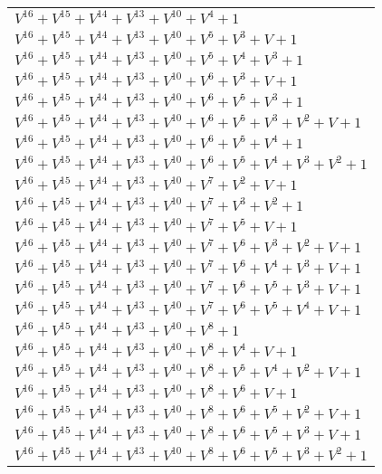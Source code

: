 \documentclass[12pt]{article}
\begin{document}
\begin{adjustwidth}{-4cm}{}
\begin{center}
\begin{longtable}{|l|}
$V^{16}  +V^{15}  +V^{14}  +V^{13}  +V^{10}  +V^{4}  + 1$ \\
$V^{16}  +V^{15}  +V^{14}  +V^{13}  +V^{10}  +V^{5}  +V^{3}  + V + 1$ \\
$V^{16}  +V^{15}  +V^{14}  +V^{13}  +V^{10}  +V^{5}  +V^{4}  +V^{3}  + 1$ \\
$V^{16}  +V^{15}  +V^{14}  +V^{13}  +V^{10}  +V^{6}  +V^{3}  + V + 1$ \\
$V^{16}  +V^{15}  +V^{14}  +V^{13}  +V^{10}  +V^{6}  +V^{5}  +V^{3}  + 1$ \\
$V^{16}  +V^{15}  +V^{14}  +V^{13}  +V^{10}  +V^{6}  +V^{5}  +V^{3}  +V^{2}  + V + 1$ \\
$V^{16}  +V^{15}  +V^{14}  +V^{13}  +V^{10}  +V^{6}  +V^{5}  +V^{4}  + 1$ \\
$V^{16}  +V^{15}  +V^{14}  +V^{13}  +V^{10}  +V^{6}  +V^{5}  +V^{4}  +V^{3}  +V^{2}  + 1$ \\
$V^{16}  +V^{15}  +V^{14}  +V^{13}  +V^{10}  +V^{7}  +V^{2}  + V + 1$ \\
$V^{16}  +V^{15}  +V^{14}  +V^{13}  +V^{10}  +V^{7}  +V^{3}  +V^{2}  + 1$ \\
$V^{16}  +V^{15}  +V^{14}  +V^{13}  +V^{10}  +V^{7}  +V^{5}  + V + 1$ \\
$V^{16}  +V^{15}  +V^{14}  +V^{13}  +V^{10}  +V^{7}  +V^{6}  +V^{3}  +V^{2}  + V + 1$ \\
$V^{16}  +V^{15}  +V^{14}  +V^{13}  +V^{10}  +V^{7}  +V^{6}  +V^{4}  +V^{3}  + V + 1$ \\
$V^{16}  +V^{15}  +V^{14}  +V^{13}  +V^{10}  +V^{7}  +V^{6}  +V^{5}  +V^{3}  + V + 1$ \\
$V^{16}  +V^{15}  +V^{14}  +V^{13}  +V^{10}  +V^{7}  +V^{6}  +V^{5}  +V^{4}  + V + 1$ \\
$V^{16}  +V^{15}  +V^{14}  +V^{13}  +V^{10}  +V^{8}  + 1$ \\
$V^{16}  +V^{15}  +V^{14}  +V^{13}  +V^{10}  +V^{8}  +V^{4}  + V + 1$ \\
$V^{16}  +V^{15}  +V^{14}  +V^{13}  +V^{10}  +V^{8}  +V^{5}  +V^{4}  +V^{2}  + V + 1$ \\
$V^{16}  +V^{15}  +V^{14}  +V^{13}  +V^{10}  +V^{8}  +V^{6}  + V + 1$ \\
$V^{16}  +V^{15}  +V^{14}  +V^{13}  +V^{10}  +V^{8}  +V^{6}  +V^{5}  +V^{2}  + V + 1$ \\
$V^{16}  +V^{15}  +V^{14}  +V^{13}  +V^{10}  +V^{8}  +V^{6}  +V^{5}  +V^{3}  + V + 1$ \\
$V^{16}  +V^{15}  +V^{14}  +V^{13}  +V^{10}  +V^{8}  +V^{6}  +V^{5}  +V^{3}  +V^{2}  + 1$ \\

\end{longtable}
\end{center}
\end{adjustwidth}
\end{document}
